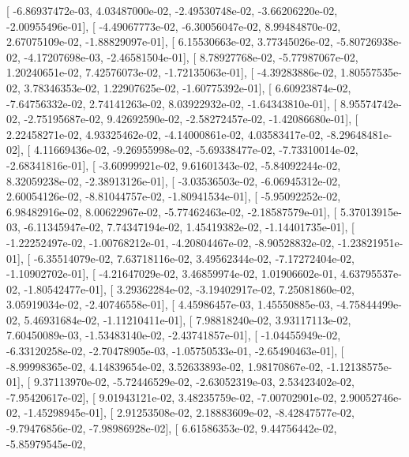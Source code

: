 \documentclass{article}
\begin{document}
       [ -6.86937472e-03,   4.03487000e-02,  -2.49530748e-02,
         -3.66206220e-02,  -2.00955496e-01],
       [ -4.49067773e-02,  -6.30056047e-02,   8.99484870e-02,
          2.67075109e-02,  -1.88829097e-01],
       [  6.15530663e-02,   3.77345026e-02,  -5.80726938e-02,
         -4.17207698e-03,  -2.46581504e-01],
       [  8.78927768e-02,  -5.77987067e-02,   1.20240651e-02,
          7.42576073e-02,  -1.72135063e-01],
       [ -4.39283886e-02,   1.80557535e-02,   3.78346353e-02,
          1.22907625e-02,  -1.60775392e-01],
       [  6.60923874e-02,  -7.64756332e-02,   2.74141263e-02,
          8.03922932e-02,  -1.64343810e-01],
       [  8.95574742e-02,  -2.75195687e-02,   9.42692590e-02,
         -2.58272457e-02,  -1.42086680e-01],
       [  2.22458271e-02,   4.93325462e-02,  -4.14000861e-02,
          4.03583417e-02,  -8.29648481e-02],
       [  4.11669436e-02,  -9.26955998e-02,  -5.69338477e-02,
         -7.73310014e-02,  -2.68341816e-01],
       [ -3.60999921e-02,   9.61601343e-02,  -5.84092244e-02,
          8.32059238e-02,  -2.38913126e-01],
       [ -3.03536503e-02,  -6.06945312e-02,   2.60054126e-02,
         -8.81044757e-02,  -1.80941534e-01],
       [ -5.95092252e-02,   6.98482916e-02,   8.00622967e-02,
         -5.77462463e-02,  -2.18587579e-01],
       [  5.37013915e-03,  -6.11345947e-02,   7.74347194e-02,
          1.45419382e-02,  -1.14401735e-01],
       [ -1.22252497e-02,  -1.00768212e-01,  -4.20804467e-02,
         -8.90528832e-02,  -1.23821951e-01],
       [ -6.35514079e-02,   7.63718116e-02,   3.49562344e-02,
         -7.17272404e-02,  -1.10902702e-01],
       [ -4.21647029e-02,   3.46859974e-02,   1.01906602e-01,
          4.63795537e-02,  -1.80542477e-01],
       [  3.29362284e-02,  -3.19402917e-02,   7.25081860e-02,
          3.05919034e-02,  -2.40746558e-01],
       [  4.45986457e-03,   1.45550885e-03,  -4.75844499e-02,
          5.46931684e-02,  -1.11210411e-01],
       [  7.98818240e-02,   3.93117113e-02,   7.60450089e-03,
         -1.53483140e-02,  -2.43741857e-01],
       [ -1.04455949e-02,  -6.33120258e-02,  -2.70478905e-03,
         -1.05750533e-01,  -2.65490463e-01],
       [ -8.99998365e-02,   4.14839654e-02,   3.52633893e-02,
          1.98170867e-02,  -1.12138575e-01],
       [  9.37113970e-02,  -5.72446529e-02,  -2.63052319e-03,
          2.53423402e-02,  -7.95420617e-02],
       [  9.01943121e-02,   3.48235759e-02,  -7.00702901e-02,
          2.90052746e-02,  -1.45298945e-01],
       [  2.91253508e-02,   2.18883609e-02,  -8.42847577e-02,
         -9.79476856e-02,  -7.98986928e-02],
       [  6.61586353e-02,   9.44756442e-02,  -5.85979545e-02,
\end{document}
